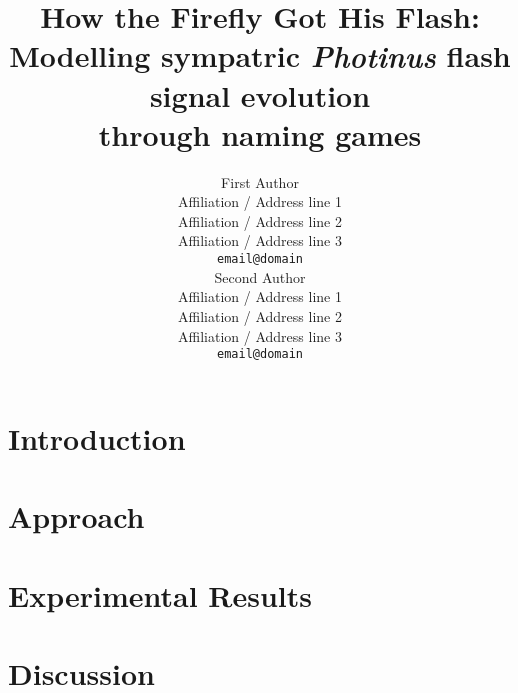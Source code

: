 \documentclass[11pt,a4paper]{article}
\title{How the Firefly Got His Flash: \\Modelling sympatric {\it Photinus} flash signal evolution\\through naming games}
\author{First Author \\
  Affiliation / Address line 1 \\
  Affiliation / Address line 2 \\
  Affiliation / Address line 3 \\
  {\tt email@domain} \\\And
  Second Author \\
  Affiliation / Address line 1 \\
  Affiliation / Address line 2 \\
  Affiliation / Address line 3 \\
  {\tt email@domain} \\}
\date{}
\newcommand{\includesection}[2]{\section{#2} \label{sec:#1} }
\begin{document}
\maketitle

%  


\includesection{intro      }{Introduction}
\includesection{approach   }{Approach}
\includesection{results}{Experimental Results}
\includesection{discussion }{Discussion}




\end{document}

